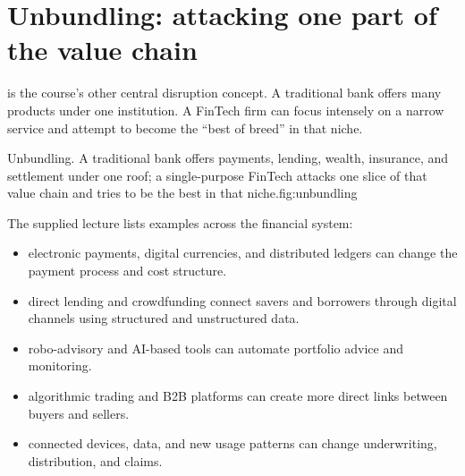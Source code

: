 \section{Unbundling: attacking one part of the value chain}

 is the course's other central disruption concept. A traditional bank offers many products under one institution. A FinTech firm can focus intensely on a narrow service and attempt to become the ``best of breed'' in that niche.

\begin{utpfig}{Unbundling. A traditional bank offers payments, lending, wealth, insurance, and settlement under one roof; a single-purpose FinTech attacks one slice of that value chain and tries to be the best in that niche.}{fig:unbundling}
\end{utpfig}

The supplied lecture lists examples across the financial system:

\begin{itemize}
  \item {} electronic payments, digital currencies, and distributed ledgers can change the payment process and cost structure.
  \item {} direct lending and crowdfunding connect savers and borrowers through digital channels using structured and unstructured data.
  \item {} robo-advisory and AI-based tools can automate portfolio advice and monitoring.
  \item {} algorithmic trading and B2B platforms can create more direct links between buyers and sellers.
  \item {} connected devices, data, and new usage patterns can change underwriting, distribution, and claims.
\end{itemize}

